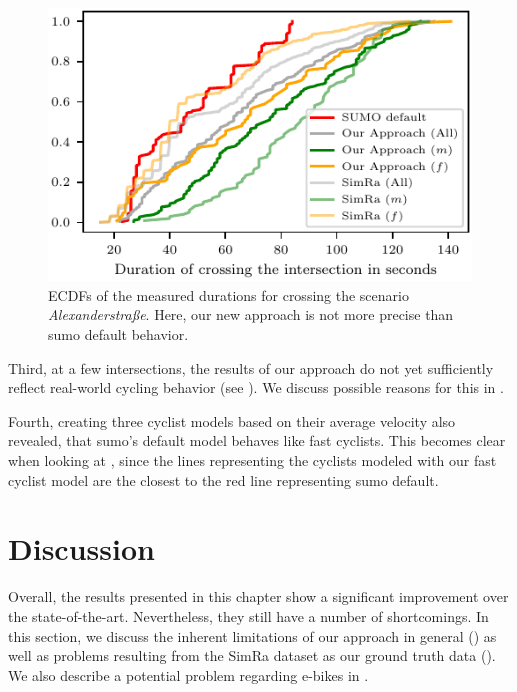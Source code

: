 \begin{figure}
    \centering
    \includegraphics[width=0.7\columnwidth]{fig/im_alex_ecdf_every.pdf}
    \caption{%
        ECDFs of the measured durations for crossing the scenario \textit{Alexanderstraße}.
        Here, our new approach is not more precise than \ac{sumo} default behavior.
    }%
    \label{fig:im_alex}
\end{figure}

Third, at a few intersections, the results of our approach do not yet sufficiently reflect real-world cycling behavior (see ).
We discuss possible reasons for this in .

Fourth, creating three cyclist models based on their average velocity also revealed, that \ac{sumo}'s default model behaves like fast cyclists.
This becomes clear when looking at , since the lines representing the cyclists modeled with our fast cyclist model are the closest to the red line representing \ac{sumo} default.


\section{Discussion}
\label{sec:discussion_sumo}
Overall, the results presented in this chapter show a significant improvement over the state-of-the-art.
Nevertheless, they still have a number of shortcomings.
In this section, we discuss the inherent limitations of our approach in general () as well as problems resulting from the SimRa dataset as our ground truth data ().
We also describe a potential problem regarding e-bikes in .

